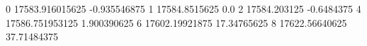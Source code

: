 0 17583.916015625 -0.935546875
1 17584.8515625 0.0
2 17584.203125 -0.6484375
4 17586.751953125 1.900390625
6 17602.19921875 17.34765625
8 17622.56640625 37.71484375
